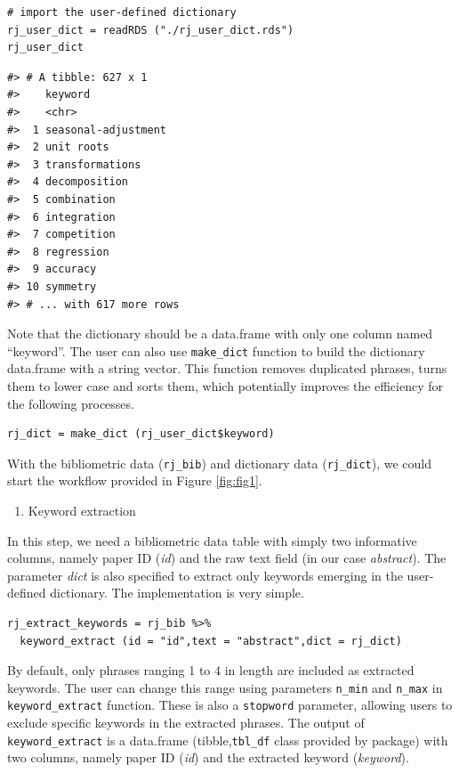 \begin{verbatim}
# import the user-defined dictionary
rj_user_dict = readRDS ("./rj_user_dict.rds")
rj_user_dict
\end{verbatim}

\begin{verbatim}
#> # A tibble: 627 x 1
#>    keyword            
#>    <chr>              
#>  1 seasonal-adjustment
#>  2 unit roots         
#>  3 transformations    
#>  4 decomposition      
#>  5 combination        
#>  6 integration        
#>  7 competition        
#>  8 regression         
#>  9 accuracy           
#> 10 symmetry           
#> # ... with 617 more rows
\end{verbatim}

Note that the dictionary should be a data.frame with only one column named ``keyword''. The user can also use \texttt{make\_dict} function to build the dictionary data.frame with a string vector. This function removes duplicated phrases, turns them to lower case and sorts them, which potentially improves the efficiency for the following processes.

\begin{verbatim}
rj_dict = make_dict (rj_user_dict$keyword)
\end{verbatim}

With the bibliometric data (\texttt{rj\_bib}) and dictionary data (\texttt{rj\_dict}), we could start the workflow provided in Figure \ref{fig:fig1}.

\begin{enumerate}
\def\labelenumi{(\arabic{enumi})}
\tightlist
\item
  Keyword extraction
\end{enumerate}

In this step, we need a bibliometric data table with simply two informative columns, namely paper ID (\emph{id}) and the raw text field (in our case \emph{abstract}). The parameter \emph{dict} is also specified to extract only keywords emerging in the user-defined dictionary. The implementation is very simple.

\begin{verbatim}
rj_extract_keywords = rj_bib %>% 
  keyword_extract (id = "id",text = "abstract",dict = rj_dict)
\end{verbatim}

By default, only phrases ranging 1 to 4 in length are included as extracted keywords. The user can change this range using parameters \texttt{n\_min} and \texttt{n\_max} in \texttt{keyword\_extract} function. These is also a \texttt{stopword} parameter, allowing users to exclude specific keywords in the extracted phrases. The output of \texttt{keyword\_extract} is a data.frame (tibble,\texttt{tbl\_df} class provided by  package) with two columns, namely paper ID (\emph{id}) and the extracted keyword (\emph{keyword}).

